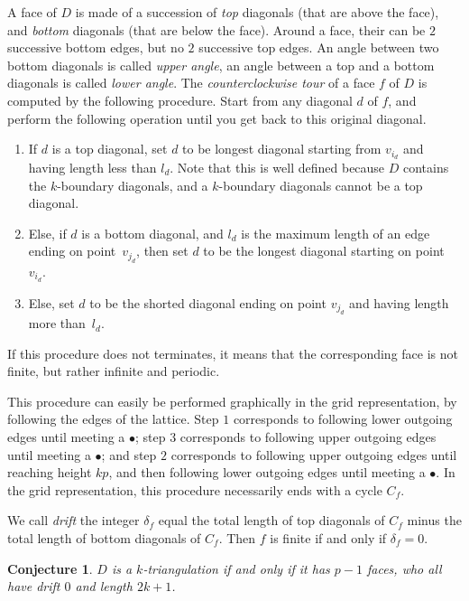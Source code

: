 \documentclass{amsart}
\newtheorem{conjecture}[theorem]{Conjecture}
\theoremstyle{remark}
\begin{document}
A face of $D$ is made of a succession of \emph{top} diagonals (that are above the face), and \emph{bottom} diagonals (that are below the face). Around a face, their can be $2$ successive bottom edges, but no $2$ successive top edges. An angle between two bottom diagonals is called \emph{upper angle}, an angle between a top and a bottom diagonals is called \emph{lower angle}.
The \emph{counterclockwise tour} of a face $f$ of $D$ is computed by the following procedure. Start from any diagonal $d$ of $f$, and perform the following operation until you get back to this original diagonal.
\begin{enumerate}
\item If $d$ is a top diagonal, set $d$ to be longest diagonal starting from $v_{i_d}$ and having length less than $l_d$. Note that this is well defined because $D$ contains the $k$-boundary diagonals, and a $k$-boundary diagonals cannot be a top diagonal.
\item Else, if $d$ is a bottom diagonal, and $l_d$ is the maximum length of an edge ending on point~$v_{j_d}$, then set $d$ to be the longest diagonal starting on point~$v_{i_d}$.
\item Else, set $d$ to be the shorted diagonal ending on point $v_{j_d}$ and having length more than~$l_d$.
\end{enumerate}
If this procedure does not terminates, it means that the corresponding face is not finite, but rather infinite and periodic.

This procedure can easily be performed graphically in the grid representation, by following the edges of the lattice. Step $1$ corresponds to following lower outgoing edges until meeting a $\bullet$; step $3$ corresponds to following upper outgoing edges until meeting a $\bullet$; and step $2$ corresponds to following upper outgoing edges until reaching height $kp$, and then following lower outgoing edges until meeting a $\bullet$.
In the grid representation, this procedure necessarily ends with a cycle $C_f$.

We call \emph{drift} the integer $\delta_f$ equal the total length of top diagonals of $C_f$ minus the total length of bottom diagonals of $C_f$.
Then $f$ is finite if and only if $\delta_f=0$.

\begin{conjecture}
$D$ is a $k$-triangulation if and only if it has $p-1$ faces, who all have drift $0$ and length $2k+1$.
\end{conjecture}

\end{document}
